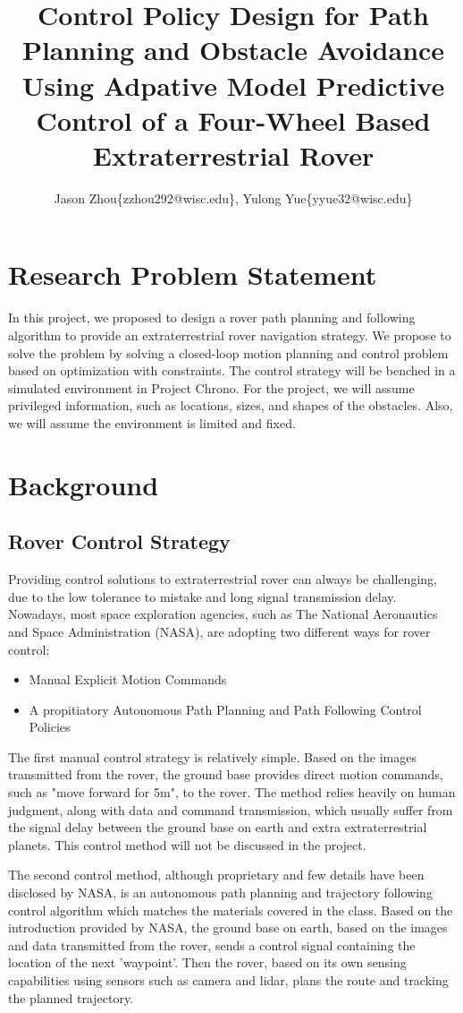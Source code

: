 \documentclass{article}
\title{Control Policy Design for Path Planning and Obstacle Avoidance Using Adpative Model Predictive Control of a Four-Wheel Based Extraterrestrial Rover}
\author{Jason Zhou\{zzhou292@wisc.edu\}, Yulong Yue\{yyue32@wisc.edu\}}
\begin{document}
\maketitle


\section{Research Problem Statement}
In this project, we proposed to design a rover path planning and following algorithm to provide an extraterrestrial rover navigation strategy. We propose to solve the problem by solving a closed-loop motion planning and control problem based on optimization with constraints. The control strategy will be benched in a simulated environment in Project Chrono. For the project, we will assume privileged information, such as locations, sizes, and shapes of the obstacles. Also, we will assume the environment is limited and fixed. 


\section{Background}
\subsection{Rover Control Strategy}
Providing control solutions to extraterrestrial rover can always be challenging, due to the low tolerance to mistake and long signal transmission delay. Nowadays, most space exploration agencies, such as The National Aeronautics and Space Administration (NASA), are adopting two different ways for rover control:

\begin{itemize}
    \item Manual Explicit Motion Commands
    \item A propitiatory Autonomous Path Planning and Path Following Control Policies
\end{itemize}

The first manual control strategy is relatively simple. Based on the images transmitted from the rover, the ground base provides direct motion commands, such as "move forward for 5m", to the rover. The method relies heavily on human judgment, along with data and command transmission, which usually suffer from the signal delay between the ground base on earth and extra extraterrestrial planets. This control method will not be discussed in the project.

The second control method, although proprietary and few details have been disclosed by NASA, is an autonomous path planning and trajectory following control algorithm which matches the materials covered in the class. Based on the introduction provided by NASA, the ground base on earth, based on the images and data transmitted from the rover, sends a control signal containing the location of the next 'waypoint'. Then the rover, based on its own sensing capabilities using sensors such as camera and lidar, plans the route and tracking the planned trajectory. \cite{NASAweb}
\end{document}

